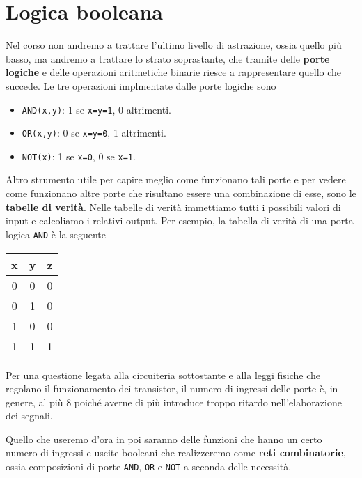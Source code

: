 \section{Logica booleana}
Nel corso non andremo a trattare l'ultimo livello di astrazione, ossia quello più basso, ma andremo
a trattare lo strato soprastante, che tramite delle \textbf{porte logiche} e delle operazioni
aritmetiche binarie riesce a rappresentare quello che succede. Le tre operazioni implmentate dalle
porte logiche sono
\begin{itemize}
	\item \verb|AND(x,y)|: 1 se \verb|x=y=1|, 0 altrimenti.
	\item \verb|OR(x,y)|: 0 se \verb|x=y=0|, 1 altrimenti.
	\item \verb|NOT(x)|: 1 se \verb|x=0|, 0 se \verb|x=1|.
\end{itemize}
Altro strumento utile per capire meglio come funzionano tali porte e per vedere come funzionano
altre porte che risultano essere una combinazione di esse, sono le \textbf{tabelle di verità}.
Nelle tabelle di verità immettiamo tutti i possibili valori di input e calcoliamo i relativi output.
Per esempio, la tabella di verità di una porta logica \verb|AND| è la seguente
\begin{center}
	\begin{tabular}{c c | c}
		x & y & z \\ \hline
		0 & 0 & 0 \\
		0 & 1 & 0 \\
		1 & 0 & 0 \\
		1 & 1 & 1
	\end{tabular}
\end{center}
Per una questione legata alla circuiteria sottostante e alla leggi fisiche che regolano il
funzionamento dei transistor, il numero di ingressi delle porte è, in genere, al più 8 poiché
averne di più introduce troppo ritardo nell'elaborazione dei segnali.

Quello che useremo d'ora in poi saranno delle funzioni che hanno un certo numero di ingressi e
uscite booleani che realizzeremo come \textbf{reti combinatorie}, ossia composizioni di porte
\verb|AND|, \verb|OR| e \verb|NOT| a seconda delle necessità.

